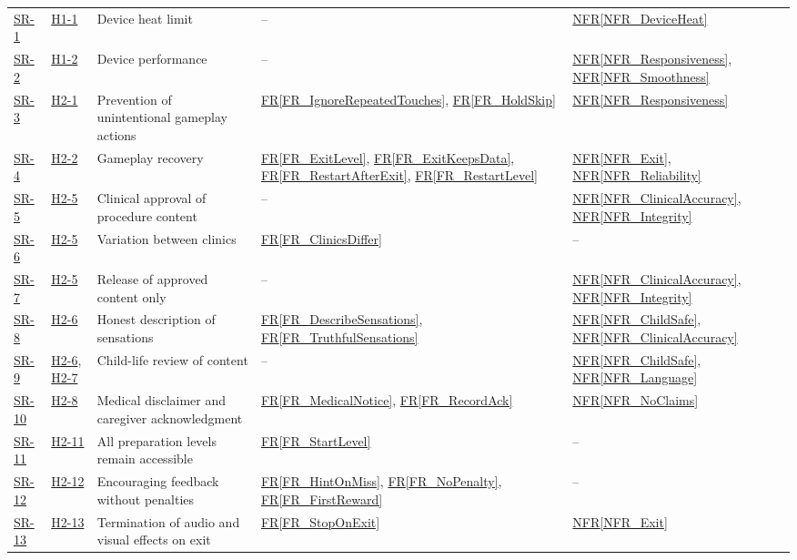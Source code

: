 \documentclass[10pt]{article}
\newcommand{\rref}[1]{\hyperref[#1]{FR\ref*{#1}}}
\newcommand{\nfrref}[1]{\hyperref[#1]{NFR\ref*{#1}}}
\newcommand{\haurl}{https://team-hindsight.github.io/ophthamology-game/HazardAnalysis/HazardAnalysis.pdf}
\newcommand{\hasrref}[2]{\href{\haurl\#nameddest=sr:#1}{SR-#2}}
\newcommand{\hahazref}[2]{\href{\haurl\#nameddest=haz:#1}{H#2}}
\begin{document}
\begin{longtable}{p{} p{} >{\raggedright\arraybackslash}p{} >{\raggedright\arraybackslash}p{} >{\raggedright\arraybackslash}p{}}
\hasrref{DeviceResourceUse}{1} & \hahazref{DeviceOverheating}{1-1} & Device heat limit & -- & \nfrref{NFR_DeviceHeat} \\
\hasrref{DevicePerformance}{2} & \hahazref{PoorPerformance}{1-2} & Device performance & -- & \nfrref{NFR_Responsiveness}, \nfrref{NFR_Smoothness} \\
\hasrref{PreventAccidentalInput}{3} & \hahazref{AccidentalInputSkipping}{2-1} & Prevention of unintentional gameplay actions & \rref{FR_IgnoreRepeatedTouches}, \rref{FR_HoldSkip} & \nfrref{NFR_Responsiveness} \\
\hasrref{GameplayRecovery}{4} & \hahazref{GameplayStuck}{2-2} & Gameplay recovery & \rref{FR_ExitLevel}, \rref{FR_ExitKeepsData}, \rref{FR_RestartAfterExit}, \rref{FR_RestartLevel} & \nfrref{NFR_Exit}, \nfrref{NFR_Reliability} \\
\hasrref{ClinicianApproval}{5} & \hahazref{InaccurateProcedure}{2-5} & Clinical approval of procedure content & -- & \nfrref{NFR_ClinicalAccuracy}, \nfrref{NFR_Integrity} \\
\hasrref{ClinicsDiffer}{6} & \hahazref{InaccurateProcedure}{2-5} & Variation between clinics & \rref{FR_ClinicsDiffer} & -- \\
\hasrref{ApprovedContent}{7} & \hahazref{InaccurateProcedure}{2-5} & Release of approved content only & -- & \nfrref{NFR_ClinicalAccuracy}, \nfrref{NFR_Integrity} \\
\hasrref{HonestSensations}{8} & \hahazref{SensationsHidden}{2-6} & Honest description of sensations & \rref{FR_DescribeSensations}, \rref{FR_TruthfulSensations} & \nfrref{NFR_ChildSafe}, \nfrref{NFR_ClinicalAccuracy} \\
\hasrref{ChildLifeReview}{9} & \hahazref{SensationsHidden}{2-6}, \hahazref{Frightening}{2-7} & Child-life review of content & -- & \nfrref{NFR_ChildSafe}, \nfrref{NFR_Language} \\
\hasrref{MedicalDisclaimer}{10} & \hahazref{MisinterpretedMedicalPurpose}{2-8} & Medical disclaimer and caregiver acknowledgment & \rref{FR_MedicalNotice}, \rref{FR_RecordAck} & \nfrref{NFR_NoClaims} \\
\hasrref{AllLevelsAccessible}{11} & \hahazref{RestrictedLevelAccess}{2-11} & All preparation levels remain accessible & \rref{FR_StartLevel} & -- \\
\hasrref{NonPunitiveFeedback}{12} & \hahazref{PunitiveFeedback}{2-12} & Encouraging feedback without penalties & \rref{FR_HintOnMiss}, \rref{FR_NoPenalty}, \rref{FR_FirstReward} & -- \\
\hasrref{StopAudioVisualsOnExit}{13} & \hahazref{AudioVisualsContinueOnExit}{2-13} & Termination of audio and visual effects on exit & \rref{FR_StopOnExit} & \nfrref{NFR_Exit} \\

\end{longtable}
\end{document}

